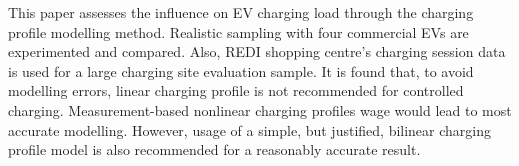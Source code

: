 	
	\noindent \cite{simolin2022assessing} This paper assesses the influence on EV charging load through the charging profile modelling method.
	Realistic sampling with four commercial EVs are experimented and compared. Also, REDI shopping centre’s charging session data is used for a large charging site evaluation sample.
	It is found that, to avoid modelling errors, linear charging profile is not recommended for controlled charging.  Measurement-based nonlinear charging profiles wage would lead to most accurate modelling.  
	However, usage of a simple, but justified, bilinear charging profile model is also recommended for a reasonably accurate result.
	 
	